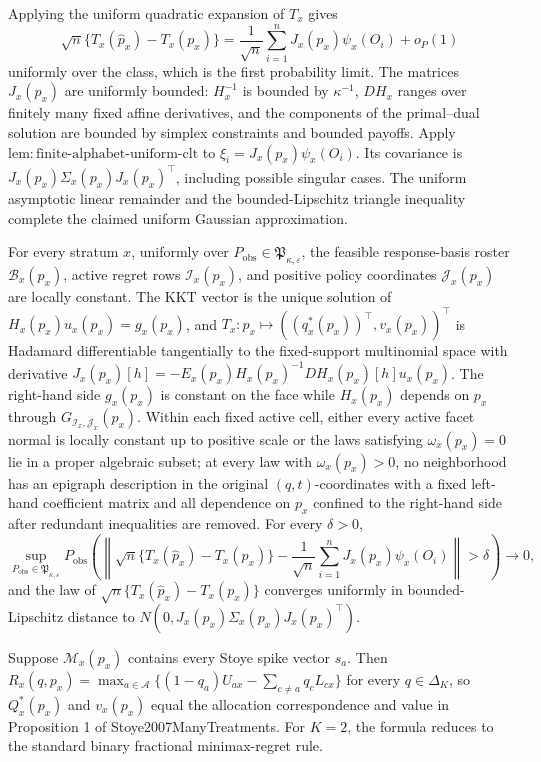 Applying the uniform quadratic expansion of \(T_x\) gives
\[
 \sqrt n\{T_x(\widehat p_x)-T_x(p_x)\}
 =\frac1{\sqrt n}\sum_{i=1}^nJ_x(p_x)\psi_x(O_i)+o_P(1)
\]
uniformly over the class, which is the first probability limit.  The matrices \(J_x(p_x)\) are uniformly bounded: \(H_x^{-1}\) is bounded by \(\kappa^{-1}\), \(DH_x\) ranges over finitely many fixed affine derivatives, and the components of the primal--dual solution are bounded by simplex constraints and bounded payoffs.  Apply \(\mathrm{lem{:}finite\text{-}alphabet\text{-}uniform\text{-}clt}\) to \(\xi_i=J_x(p_x)\psi_x(O_i)\).  Its covariance is \(J_x(p_x)\Sigma_x(p_x)J_x(p_x)^\top\), including possible singular cases.  The uniform asymptotic linear remainder and the bounded-Lipschitz triangle inequality complete the claimed uniform Gaussian approximation.

For every stratum \(x\), uniformly over \(P_{\mathrm{obs}}\in\mathfrak P_{\kappa,\varepsilon}\), the feasible response-basis roster \(\mathcal B_x(p_x)\), active regret rows \(\mathcal I_x(p_x)\), and positive policy coordinates \(\mathcal J_x(p_x)\) are locally constant. The KKT vector is the unique solution of \(H_x(p_x)u_x(p_x)=g_x(p_x)\), and \(T_x:p_x\mapsto((q_x^*(p_x))^\top,v_x(p_x))^\top\) is Hadamard differentiable tangentially to the fixed-support multinomial space with derivative \(J_x(p_x)[h]=-E_x(p_x)H_x(p_x)^{-1}DH_x(p_x)[h]u_x(p_x)\). The right-hand side \(g_x(p_x)\) is constant on the face while \(H_x(p_x)\) depends on \(p_x\) through \(G_{\mathcal I_x,\mathcal J_x}(p_x)\). Within each fixed active cell, either every active facet normal is locally constant up to positive scale or the laws satisfying \(\omega_x(p_x)=0\) lie in a proper algebraic subset; at every law with \(\omega_x(p_x)>0\), no neighborhood has an epigraph description in the original \((q,t)\)-coordinates with a fixed left-hand coefficient matrix and all dependence on \(p_x\) confined to the right-hand side after redundant inequalities are removed. For every \(\delta>0\),
\[
\sup_{P_{\mathrm{obs}}\in\mathfrak P_{\kappa,\varepsilon}}P_{\mathrm{obs}}\left(\left\|\sqrt n\{T_x(\widehat p_x)-T_x(p_x)\}-\frac1{\sqrt n}\sum_{i=1}^nJ_x(p_x)\psi_x(O_i)\right\|>\delta\right)\longrightarrow0,
\]
and the law of \(\sqrt n\{T_x(\widehat p_x)-T_x(p_x)\}\) converges uniformly in bounded-Lipschitz distance to \(N(0,J_x(p_x)\Sigma_x(p_x)J_x(p_x)^\top)\).

Suppose \(\mathcal M_x(p_x)\) contains every Stoye spike vector \(s_a\). Then \(R_x(q,p_x)=\max_{a\in\mathcal A}\{(1-q_a)U_{ax}-\sum_{c\neq a}q_cL_{cx}\}\) for every \(q\in\Delta_K\), so \(Q_x^*(p_x)\) and \(v_x(p_x)\) equal the allocation correspondence and value in Proposition 1 of Stoye2007ManyTreatments. For \(K=2\), the formula reduces to the standard binary fractional minimax-regret rule.

